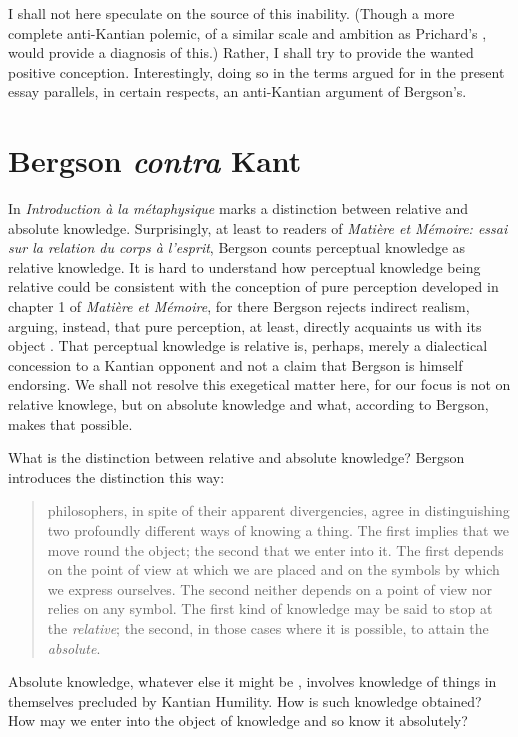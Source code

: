 I shall not here speculate on the source of this inability. (Though a more complete anti-Kantian polemic, of a similar scale and ambition as Prichard's \citeyear{Prichard:1909yg}, would provide a diagnosis of this.) Rather, I shall try to provide the wanted positive conception. Interestingly, doing so in the terms argued for in the present essay parallels, in certain respects, an anti-Kantian argument of Bergson's.


\section{Bergson \emph{contra} Kant} %
\label{sec:bergson_contra_kant}

In \emph{Introduction \`{a} la m\'{e}taphysique} \citet{Bergson:1903nx} marks a distinction between relative and absolute knowledge. Surprisingly, at least to readers of \emph{Mati\`{e}re et M\'{e}moire: essai sur la relation du corps \`{a} l'esprit}, Bergson counts perceptual knowledge as relative knowledge. It is hard to understand how perceptual knowledge being relative could be consistent with the conception of pure perception developed in chapter 1 of \emph{Mati\`{e}re et M\'{e}moire}, for there Bergson rejects indirect realism, arguing, instead, that pure perception, at least, directly acquaints us with its object \citep[though see][for a reconciliationist reading, 39--41]{Moore:1996rt}. That perceptual knowledge is relative is, perhaps, merely a dialectical concession to a Kantian opponent and not a claim that Bergson is himself endorsing. We shall not resolve this exegetical matter here, for our focus is not on relative knowlege, but on absolute knowledge and what, according to Bergson, makes that possible.

What is the distinction between relative and absolute knowledge? Bergson introduces the distinction this way:
\begin{quote}
	philosophers, in spite of their apparent divergencies, agree in distinguishing two profoundly different ways of knowing a thing. The first implies that we move round the object; the second that we enter into it. The first depends on the point of view at which we are placed and on the symbols by which we express ourselves. The second neither depends on a point of view nor relies on any symbol. The first kind of knowledge may be said to stop at the \emph{relative}; the second, in those cases where it is possible, to attain the \emph{absolute}. \citep[1]{Bergson:1912ud}
\end{quote}
Absolute knowledge, whatever else it might be \citep[for discussion see][chapter 6]{Lacey:1989bv}, involves knowledge of things in themselves precluded by Kantian Humility. How is such knowledge obtained? How may we enter into the object of knowledge and so know it absolutely?

